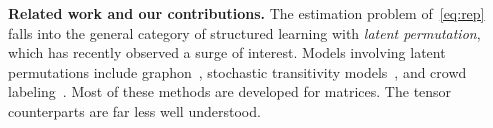 \documentclass{article}
\theoremstyle{definition}
\begin{document}
{\bf Related work and our contributions.} The estimation problem of~\eqref{eq:rep} falls into the general category of structured learning with \emph{latent permutation}, which has recently observed a surge of interest. Models involving latent permutations include graphon~\cite{gao2018minimax,klopp2017oracle}, stochastic transitivity models~\cite{shah2019low},  and crowd labeling~\cite{shah2020permutation}. Most of these methods are developed for matrices. The tensor counterparts  are far less well understood. 
\end{document}
